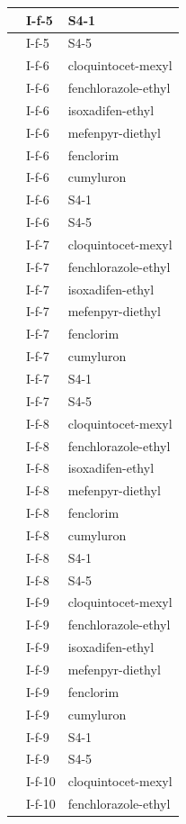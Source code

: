 \documentclass[11pt,a4paper]{article}
\begin{document}
\begin{table}[h]
\begin{tabular}{|l|l|l|}
 & I-f-5 & S4-1 \\ \hline
 & I-f-5 & S4-5 \\ \hline
 & I-f-6 & cloquintocet-mexyl \\ \hline
 & I-f-6 & fenchlorazole-ethyl \\ \hline
 & I-f-6 & isoxadifen-ethyl \\ \hline
 & I-f-6 & mefenpyr-diethyl \\ \hline
 & I-f-6 & fenclorim \\ \hline
 & I-f-6 & cumyluron \\ \hline
 & I-f-6 & S4-1 \\ \hline
 & I-f-6 & S4-5 \\ \hline
 & I-f-7 & cloquintocet-mexyl \\ \hline
 & I-f-7 & fenchlorazole-ethyl \\ \hline
 & I-f-7 & isoxadifen-ethyl \\ \hline
 & I-f-7 & mefenpyr-diethyl \\ \hline
 & I-f-7 & fenclorim \\ \hline
 & I-f-7 & cumyluron \\ \hline
 & I-f-7 & S4-1 \\ \hline
 & I-f-7 & S4-5 \\ \hline
 & I-f-8 & cloquintocet-mexyl \\ \hline
 & I-f-8 & fenchlorazole-ethyl \\ \hline
 & I-f-8 & isoxadifen-ethyl \\ \hline
 & I-f-8 & mefenpyr-diethyl \\ \hline
 & I-f-8 & fenclorim \\ \hline
 & I-f-8 & cumyluron \\ \hline
 & I-f-8 & S4-1 \\ \hline
 & I-f-8 & S4-5 \\ \hline
 & I-f-9 & cloquintocet-mexyl \\ \hline
 & I-f-9 & fenchlorazole-ethyl \\ \hline
 & I-f-9 & isoxadifen-ethyl \\ \hline
 & I-f-9 & mefenpyr-diethyl \\ \hline
 & I-f-9 & fenclorim \\ \hline
 & I-f-9 & cumyluron \\ \hline
 & I-f-9 & S4-1 \\ \hline
 & I-f-9 & S4-5 \\ \hline
 & I-f-10 & cloquintocet-mexyl \\ \hline
 & I-f-10 & fenchlorazole-ethyl \\ \hline

\end{tabular}
\end{table}
\end{document}
